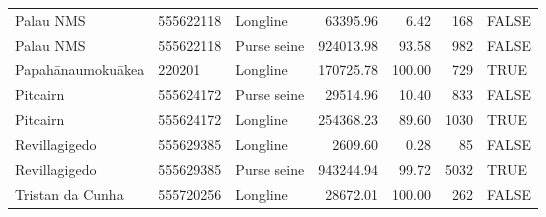 \begin{table}
\begin{tabular}[t]{lllrrrl}
Palau NMS & 555622118 & Longline & 63395.96 & 6.42 & 168 & FALSE\\
Palau NMS & 555622118 & Purse seine & 924013.98 & 93.58 & 982 & FALSE\\
Papahānaumokuākea & 220201 & Longline & 170725.78 & 100.00 & 729 & TRUE\\
Pitcairn & 555624172 & Purse seine & 29514.96 & 10.40 & 833 & FALSE\\
Pitcairn & 555624172 & Longline & 254368.23 & 89.60 & 1030 & TRUE\\
Revillagigedo & 555629385 & Longline & 2609.60 & 0.28 & 85 & FALSE\\
Revillagigedo & 555629385 & Purse seine & 943244.94 & 99.72 & 5032 & TRUE\\
Tristan da Cunha & 555720256 & Longline & 28672.01 & 100.00 & 262 & FALSE\\
\bottomrule
\end{tabular}
\end{table}
